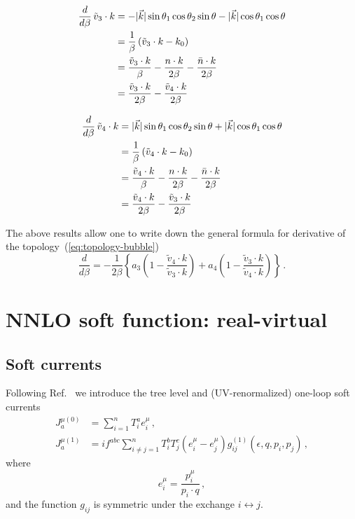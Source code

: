 \documentclass[a4paper,11pt]{report}
\numberwithin{equation}{section}
\begin{document}
\begin{align}
  \frac{d}{d\beta}\, \tilde v_3 \cdot k 
  & = 
  - |\vec k| \sin\theta_1\cos\theta_2\sin\theta -
    |\vec k| \cos\theta_1\cos\theta \\
  & = 
  \frac{1}{\beta}\left(\tilde v_3 \cdot k - k_0 \right) \\
  & = 
  \frac{\tilde v_3 \cdot k}{\beta} -
  \frac{n\cdot k}{2\beta} - \frac{\bar{n}\cdot k}{2\beta} \\
  & = 
  \frac{\tilde v_3 \cdot k}{2\beta} - \frac{\tilde v_4 \cdot k}{2\beta}
\end{align}

\begin{align}
  \frac{d}{d\beta}\, \tilde v_4 \cdot k 
  & = 
    |\vec k| \sin\theta_1\cos\theta_2\sin\theta +
    |\vec k| \cos\theta_1\cos\theta \\
  & = 
  \frac{1}{\beta}\left(\tilde v_4 \cdot k-k_0  \right) \\
  & = 
  \frac{\tilde v_4 \cdot k}{\beta} -
  \frac{n\cdot k}{2\beta} - \frac{\bar{n}\cdot k}{2\beta} \\
  & = 
  \frac{\tilde v_4 \cdot k}{2\beta} - \frac{\tilde v_3 \cdot k}{2\beta}
\end{align}

The above results allow one to write down the general formula for derivative of
the topology~(\ref{eq:topology-bubble})
%
\begin{equation}
  \frac{d}{d\beta} = 
  -\frac{1}{2\beta}\left\{
  a_3 \left(1-\frac{\tilde v_4 \cdot k}{\tilde v_3 \cdot k}\right) +
  a_4 \left(1-\frac{\tilde v_3 \cdot k}{\tilde v_4 \cdot k}\right)
  \right\}\,.
\end{equation}


\chapter{NNLO soft function: real-virtual}

\section{Soft currents}

Following Ref.~\cite{Bierenbaum:2011gg} we introduce the tree level and (UV-renormalized) one-loop soft currents
%
\begin{align}
  J_a^{\mu (0)} & = \sum_{i=1}^n T_i^a e_i^\mu\,,
  \\
  J_a^{\mu (1)} & = i f^{abc} \sum_{i\neq j=1}^n T_i^b T_j^c 
                    \left(e_i^\mu-e_j^\mu\right) 
		    g_{ij}^{(1)}(\epsilon,q, p_i, p_j)\,,
\end{align}
%
where
%
\begin{equation}
  e_i^\mu = \frac{p_i^\mu}{p_i \cdot q}\,,
\end{equation}
%
and the function $g_{ij}$ is symmetric under the exchange $i\leftrightarrow j$.
\end{document}
